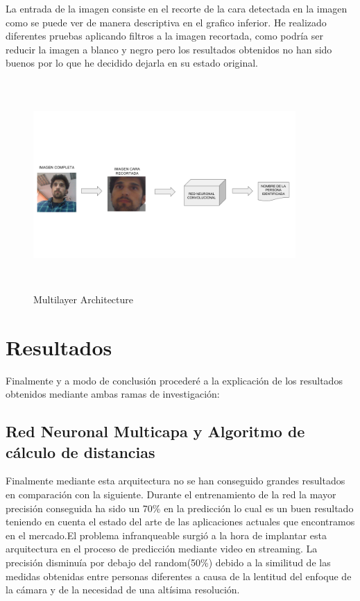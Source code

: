 \documentclass{article}
\begin{document}
La entrada de la imagen consiste en el recorte de la cara detectada en la imagen como se puede ver de manera descriptiva en el grafico inferior. He realizado diferentes pruebas aplicando filtros a la imagen recortada, como podría ser reducir la imagen a blanco y negro pero los resultados obtenidos no han sido buenos por lo que he decidido dejarla en su estado original.

\begin{figure}[H]
  \centering
  \includegraphics[width=100mm, height=80mm]{images/Flowchart_conv.png}
  \caption{Multilayer Architecture}
\end{figure}

\section{Resultados}
Finalmente y a modo de conclusión procederé a la explicación de los resultados obtenidos mediante ambas ramas de investigación:

\subsection{Red Neuronal Multicapa y Algoritmo de cálculo de distancias}
Finalmente mediante esta arquitectura no se han conseguido grandes resultados en comparación con la siguiente.
Durante el entrenamiento de la red la mayor precisión conseguida ha sido un 70\% en la predicción lo cual es un buen resultado teniendo en cuenta el estado del arte de las aplicaciones actuales que encontramos en el mercado.\newline El problema infranqueable surgió a la hora de implantar esta arquitectura en el proceso de predicción mediante video en streaming. La precisión disminuía por debajo del random(50\%) debido a la similitud de las medidas obtenidas entre personas diferentes a causa de la lentitud del enfoque de la cámara y de la necesidad de una altísima resolución.
\end{document}
